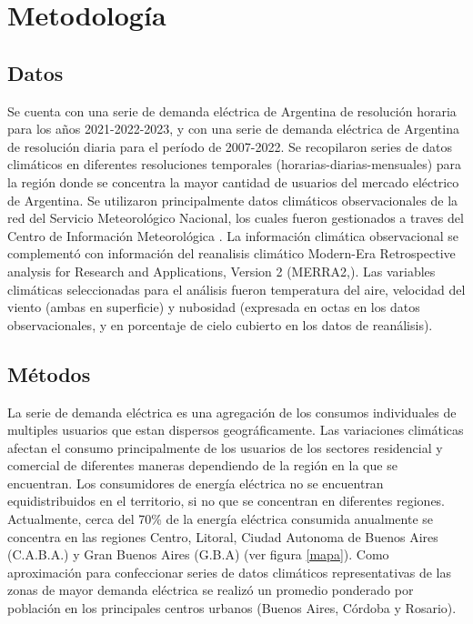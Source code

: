 \documentclass[11pt,a4paper]{article}
\begin{document}
\section{Metodología}
\subsection{Datos}
Se cuenta con una serie de demanda eléctrica de Argentina de resolución horaria para los años 2021-2022-2023, y con una serie de demanda eléctrica de Argentina de resolución diaria para el período de 2007-2022. Se recopilaron series de datos climáticos en diferentes resoluciones temporales (horarias-diarias-mensuales) para la región donde se concentra la mayor cantidad de usuarios del mercado eléctrico de Argentina. Se utilizaron principalmente datos climáticos observacionales de la red del Servicio Meteorológico Nacional, los cuales fueron gestionados a traves del Centro de Información Meteorológica \cite{smn}. La información climática observacional se complementó con información del reanalisis
climático Modern-Era Retrospective analysis for Research and Applications, Version 2 (MERRA2,\cite{merra, gelaro2017modern}). Las variables climáticas seleccionadas para el análisis fueron temperatura del aire, velocidad del viento (ambas en superficie) y nubosidad (expresada en octas en los datos observacionales, y en porcentaje de cielo cubierto en los datos de reanálisis).

\subsection{Métodos}
La serie de demanda eléctrica es una agregación de los consumos individuales de multiples usuarios que estan dispersos geográficamente. Las variaciones climáticas afectan el consumo principalmente de los usuarios de los sectores residencial y comercial de diferentes maneras dependiendo de la región en la que se encuentran. Los consumidores de energía eléctrica no se encuentran equidistribuidos en el territorio, si no que se concentran en diferentes regiones. Actualmente, cerca del 70\% de la energía eléctrica consumida anualmente se concentra en las regiones Centro, Litoral, Ciudad Autonoma de Buenos Aires (C.A.B.A.) y Gran Buenos Aires (G.B.A) (ver figura \ref{mapa}). Como aproximación para confeccionar series de datos climáticos representativas de las zonas de mayor demanda eléctrica se realizó un promedio ponderado por población en los principales centros urbanos (Buenos Aires, Córdoba y Rosario).
\end{document}
